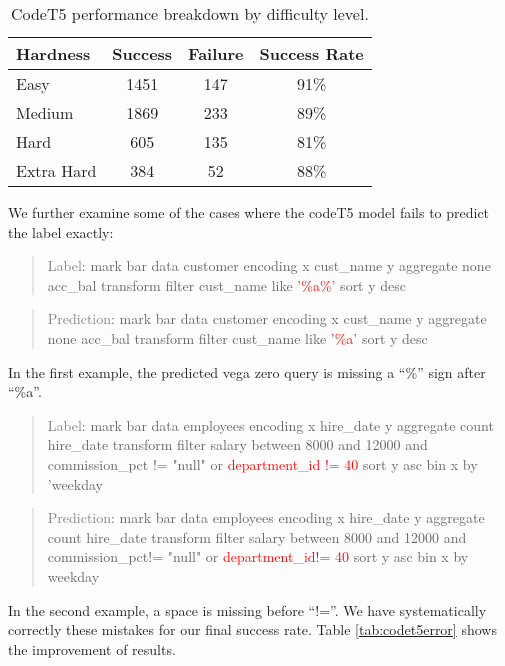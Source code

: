 \documentclass[
	a4paper, %
	10pt, %
	unnumberedsections, %
	twoside, %
]{t0003}
\newcommand{\gray}[1]{\textcolor{gray}{#1}}
\newcommand{\red}[1]{\textcolor{red}{#1}}
\begin{document}
\begin{table}
	\caption{CodeT5 performance breakdown by difficulty level.}
	\centering
	\begin{tabular}{lccc}
		\toprule
		Hardness & Success & Failure & Success Rate \\
		\midrule
		Easy & 1451 & 147 & 91\% \\
		Medium & 1869 & 233 & 89\% \\
		Hard & 605 & 135 & 81\% \\
		Extra Hard & 384 & 52 & 88\% \\
		\bottomrule
	\end{tabular}
	\label{tab:codet5rate}
\end{table}

We further examine some of the cases where the codeT5 model fails to predict the label exactly:

\begin{quote}
\gray{Label}: mark bar data customer encoding x cust\_name y aggregate none acc\_bal transform filter cust\_name like \red{'\%a\%'} sort y desc
\end{quote}

\begin{quote}
\gray{Prediction}: mark bar data customer encoding x cust\_name y aggregate none acc\_bal transform filter cust\_name like \red{'\%a'} sort y desc
\end{quote}

In the first example, the predicted vega zero query is missing a ``\%'' sign after ``\%a''.

\begin{quote}
\gray{Label}: mark bar data employees encoding x hire\_date y aggregate count hire\_date transform filter salary between 8000 and 12000 and commission\_pct != "null" or \red{department\_id != 40} sort y asc bin x by 'weekday
\end{quote}

\begin{quote}
\gray{Prediction}: mark bar data employees encoding x hire\_date y aggregate count hire\_date transform filter salary between 8000 and 12000 and commission\_pct!= "null" or \red{department\_id!= 40} sort y asc bin x by weekday
\end{quote}

In the second example, a space is missing before ``!=''. We have systematically correctly these mistakes for our final success rate. Table \ref{tab:codet5error} shows the improvement of results.
\end{document}
